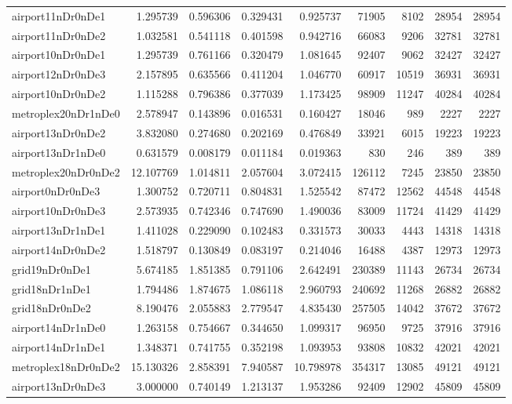 \begin{longtable}{|l|r|r|r|r|r|r|r|r|}
airport11nDr0nDe1 & 1.295739 & 0.596306 & 0.329431 & 0.925737 & 71905 & 8102 & 28954 & 28954 \\
airport11nDr0nDe2 & 1.032581 & 0.541118 & 0.401598 & 0.942716 & 66083 & 9206 & 32781 & 32781 \\
airport10nDr0nDe1 & 1.295739 & 0.761166 & 0.320479 & 1.081645 & 92407 & 9062 & 32427 & 32427 \\
airport12nDr0nDe3 & 2.157895 & 0.635566 & 0.411204 & 1.046770 & 60917 & 10519 & 36931 & 36931 \\
airport10nDr0nDe2 & 1.115288 & 0.796386 & 0.377039 & 1.173425 & 98909 & 11247 & 40284 & 40284 \\
metroplex20nDr1nDe0 & 2.578947 & 0.143896 & 0.016531 & 0.160427 & 18046 & 989 & 2227 & 2227 \\
airport13nDr0nDe2 & 3.832080 & 0.274680 & 0.202169 & 0.476849 & 33921 & 6015 & 19223 & 19223 \\
airport13nDr1nDe0 & 0.631579 & 0.008179 & 0.011184 & 0.019363 & 830 & 246 & 389 & 389 \\
metroplex20nDr0nDe2 & 12.107769 & 1.014811 & 2.057604 & 3.072415 & 126112 & 7245 & 23850 & 23850 \\
airport0nDr0nDe3 & 1.300752 & 0.720711 & 0.804831 & 1.525542 & 87472 & 12562 & 44548 & 44548 \\
airport10nDr0nDe3 & 2.573935 & 0.742346 & 0.747690 & 1.490036 & 83009 & 11724 & 41429 & 41429 \\
airport13nDr1nDe1 & 1.411028 & 0.229090 & 0.102483 & 0.331573 & 30033 & 4443 & 14318 & 14318 \\
airport14nDr0nDe2 & 1.518797 & 0.130849 & 0.083197 & 0.214046 & 16488 & 4387 & 12973 & 12973 \\
grid19nDr0nDe1 & 5.674185 & 1.851385 & 0.791106 & 2.642491 & 230389 & 11143 & 26734 & 26734 \\
grid18nDr1nDe1 & 1.794486 & 1.874675 & 1.086118 & 2.960793 & 240692 & 11268 & 26882 & 26882 \\
grid18nDr0nDe2 & 8.190476 & 2.055883 & 2.779547 & 4.835430 & 257505 & 14042 & 37672 & 37672 \\
airport14nDr1nDe0 & 1.263158 & 0.754667 & 0.344650 & 1.099317 & 96950 & 9725 & 37916 & 37916 \\
airport14nDr1nDe1 & 1.348371 & 0.741755 & 0.352198 & 1.093953 & 93808 & 10832 & 42021 & 42021 \\
metroplex18nDr0nDe2 & 15.130326 & 2.858391 & 7.940587 & 10.798978 & 354317 & 13085 & 49121 & 49121 \\
airport13nDr0nDe3 & 3.000000 & 0.740149 & 1.213137 & 1.953286 & 92409 & 12902 & 45809 & 45809 \\

\end{longtable}
